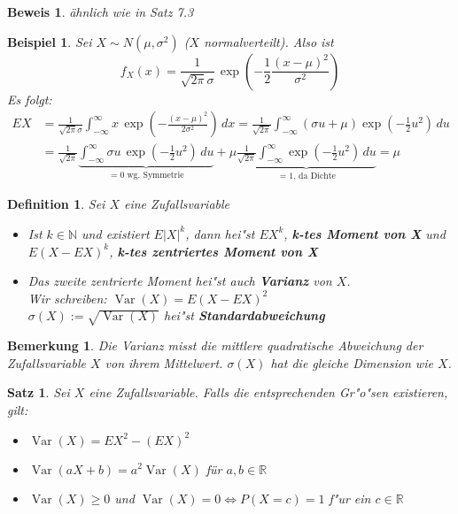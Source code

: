 \documentclass[a4paper,11pt]{book}
\newcommand{\R}{{\mathbb R}}
\newcommand{\N}{{\mathbb N}}
\DeclareMathOperator{\var}{Var}
\newtheorem{Def}{Definition}[chapter]
\newtheorem{Sa}{Satz}[chapter]
\newtheorem{Bsp}{Beispiel}[chapter]
\newtheorem{Bem}{Bemerkung}[chapter]
\theoremstyle{nonumberplain}
\newtheorem{Bew}{Beweis}
\begin{document}
\begin{Bew} ähnlich wie in Satz 7.3 \end{Bew}

\begin{Bsp}
Sei $X\sim N(\mu,\sigma^2)$ ($X$ normalverteilt). Also ist
\[f_X(x)=\frac{1}{\sqrt{2\pi}\sigma}\, \exp(-\frac12\frac{(x-\mu)^2}{\sigma^2})\]
Es folgt:
\begin{align*}EX &= \frac{1}{\sqrt{2\pi}\sigma}\int_{-\infty}^\infty x\,\exp(-\frac{(x-\mu)^2}{2\sigma^2})\,dx
= \frac{1}{\sqrt{2\pi}}\int_{-\infty}^\infty (\sigma u+\mu)\exp(-\frac{1}{2}u^2)\,du \\
&=\frac{1}{\sqrt{2\pi}}\underbrace{\int_{-\infty}^\infty \sigma u\, \exp(-\frac{1}{2}u^2)\,du}_{=0\text{ wg. Symmetrie}} + \mu \underbrace{\frac{1}{\sqrt{2\pi}}\int_{-\infty}^\infty \exp(-\frac{1}{2}u^2)\,du}_{=1\text{, da Dichte}} = \mu
\end{align*}
\end{Bsp}

\begin{Def}
Sei $X$ eine Zufallsvariable
\begin{itemize}
\item [a)] Ist $k\in \N$ und existiert $E|X|^k$, dann hei"st $EX^k$, \textbf{k-tes Moment von X} und $E(X-EX)^k$, \textbf{k-tes zentriertes Moment von X}
\item [b)] Das zweite zentrierte Moment hei"st auch \textbf{Varianz} von $X$.\\
Wir schreiben: $\var(X)=E(X-EX)^2$\\
$\sigma(X):=\sqrt{\var(X)}$ hei"st \textbf{Standardabweichung}
\end{itemize}
\end{Def}

\begin{Bem}
Die Varianz misst die mittlere quadratische Abweichung der Zufallsvariable $X$ von ihrem Mittelwert. $\sigma(X)$ hat die gleiche Dimension wie $X$.
\end{Bem}


\begin{Sa}
Sei $X$ eine Zufallsvariable. Falls die entsprechenden Gr"o"sen existieren, gilt:
\begin{itemize}
\item [a)] $\var(X)=EX^2-(EX)^2$
\item [b)] $\var(aX+b)=a^2 \var(X)$ für $a,b\in\R$
\item [c)] $\var(X)\geq 0$ und $\var(X)=0 \Leftrightarrow P(X=c)=1$ f"ur ein $c\in\R$
\end{itemize}
\end{Sa}
\end{document}
